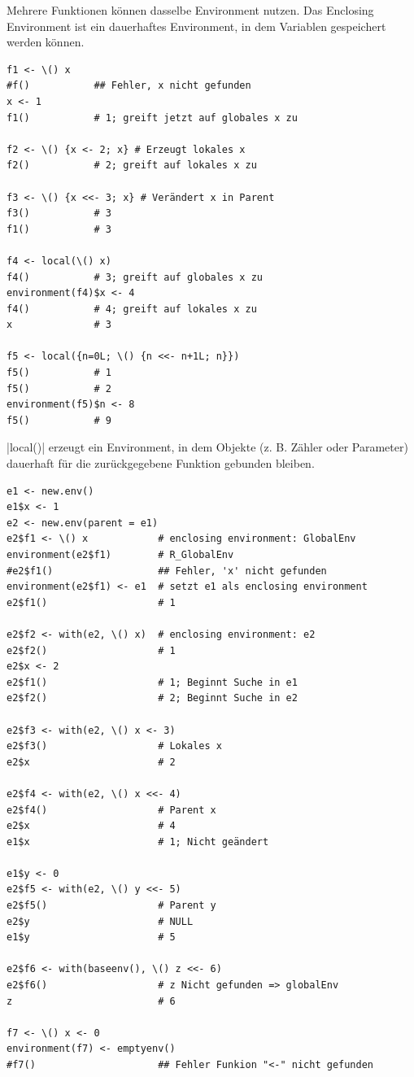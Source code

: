 \documentclass[10pt,twocolumn]{scrartcl}
\renewcommand{\lstinline}{\mycoloredinline}
\begin{document}
Mehrere Funktionen können dasselbe Environment nutzen. Das Enclosing Environment ist ein dauerhaftes Environment, in dem Variablen gespeichert werden können.

\begin{lstlisting}
f1 <- \() x
#f()           ## Fehler, x nicht gefunden
x <- 1
f1()           # 1; greift jetzt auf globales x zu

f2 <- \() {x <- 2; x} # Erzeugt lokales x
f2()           # 2; greift auf lokales x zu

f3 <- \() {x <<- 3; x} # Verändert x in Parent
f3()           # 3
f1()           # 3

f4 <- local(\() x)
f4()           # 3; greift auf globales x zu
environment(f4)$x <- 4
f4()           # 4; greift auf lokales x zu
x              # 3

f5 <- local({n=0L; \() {n <<- n+1L; n}})
f5()           # 1
f5()           # 2
environment(f5)$n <- 8
f5()           # 9
\end{lstlisting}

\lstinline|local()| erzeugt ein Environment, in dem Objekte (z. B. Zähler oder Parameter) dauerhaft für die zurückgegebene Funktion gebunden bleiben.

\begin{lstlisting}
e1 <- new.env()
e1$x <- 1
e2 <- new.env(parent = e1)
e2$f1 <- \() x            # enclosing environment: GlobalEnv
environment(e2$f1)        # R_GlobalEnv
#e2$f1()                  ## Fehler, 'x' nicht gefunden
environment(e2$f1) <- e1  # setzt e1 als enclosing environment
e2$f1()                   # 1

e2$f2 <- with(e2, \() x)  # enclosing environment: e2
e2$f2()                   # 1
e2$x <- 2
e2$f1()                   # 1; Beginnt Suche in e1
e2$f2()                   # 2; Beginnt Suche in e2

e2$f3 <- with(e2, \() x <- 3)
e2$f3()                   # Lokales x
e2$x                      # 2

e2$f4 <- with(e2, \() x <<- 4)
e2$f4()                   # Parent x
e2$x                      # 4
e1$x                      # 1; Nicht geändert

e1$y <- 0
e2$f5 <- with(e2, \() y <<- 5)
e2$f5()                   # Parent y
e2$y                      # NULL
e1$y                      # 5

e2$f6 <- with(baseenv(), \() z <<- 6)
e2$f6()                   # z Nicht gefunden => globalEnv
z                         # 6

f7 <- \() x <- 0
environment(f7) <- emptyenv()
#f7()                     ## Fehler Funkion "<-" nicht gefunden
\end{lstlisting}
\end{document}
